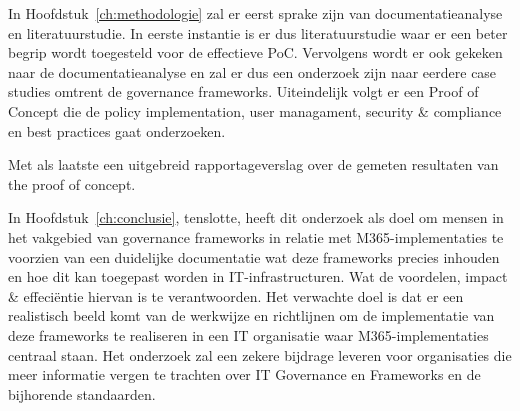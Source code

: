 In Hoofdstuk~\ref{ch:methodologie} zal er eerst sprake zijn van documentatieanalyse en literatuurstudie. In eerste instantie is er dus literatuurstudie waar er een beter begrip wordt toegesteld voor de effectieve PoC.
Vervolgens wordt er ook gekeken naar de documentatieanalyse en zal er dus een onderzoek zijn naar eerdere case studies omtrent de governance frameworks.
Uiteindelijk volgt er een Proof of Concept die de policy implementation, user managament, security \& compliance en best practices gaat onderzoeken.

Met als laatste een uitgebreid rapportageverslag over de gemeten resultaten van the proof of concept.


In Hoofdstuk~\ref{ch:conclusie}, tenslotte, heeft dit onderzoek  als doel om mensen in het vakgebied van governance frameworks in relatie met M365-implementaties te voorzien van een duidelijke documentatie wat deze frameworks precies inhouden en hoe dit kan toegepast worden in IT-infrastructuren. Wat de voordelen, impact \& effeciëntie hiervan is te verantwoorden. Het verwachte doel is dat er een realistisch beeld komt van de werkwijze en richtlijnen om de implementatie van deze frameworks te realiseren in een IT organisatie waar M365-implementaties centraal staan.
Het onderzoek zal een zekere bijdrage leveren voor organisaties die meer informatie vergen te trachten over IT Governance en Frameworks en de bijhorende standaarden.
